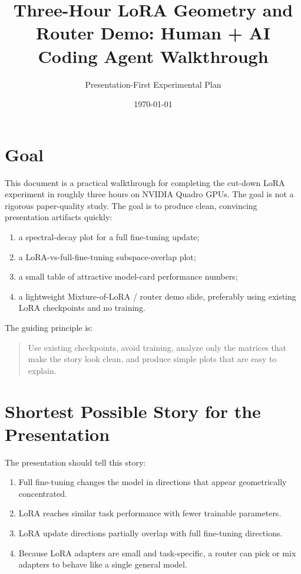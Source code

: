 \documentclass[11pt]{article}
\title{Three-Hour LoRA Geometry and Router Demo: Human + AI Coding Agent Walkthrough}
\author{Presentation-First Experimental Plan}
\date{\today}
\begin{document}
\maketitle

\section{Goal}

This document is a practical walkthrough for completing the cut-down LoRA experiment in roughly three hours on NVIDIA Quadro GPUs. The goal is not a rigorous paper-quality study. The goal is to produce clean, convincing presentation artifacts quickly:

\begin{enumerate}[leftmargin=*]
    \item a spectral-decay plot for a full fine-tuning update;
    \item a LoRA-vs-full-fine-tuning subspace-overlap plot;
    \item a small table of attractive model-card performance numbers;
    \item a lightweight Mixture-of-LoRA / router demo slide, preferably using existing LoRA checkpoints and no training.
\end{enumerate}

The guiding principle is:

\begin{quote}
Use existing checkpoints, avoid training, analyze only the matrices that make the story look clean, and produce simple plots that are easy to explain.
\end{quote}

\section{Shortest Possible Story for the Presentation}

The presentation should tell this story:

\begin{enumerate}[leftmargin=*]
    \item Full fine-tuning changes the model in directions that appear geometrically concentrated.
    \item LoRA reaches similar task performance with fewer trainable parameters.
    \item LoRA update directions partially overlap with full fine-tuning directions.
    \item Because LoRA adapters are small and task-specific, a router can pick or mix adapters to behave like a single general model.
\end{enumerate}
\end{document}
